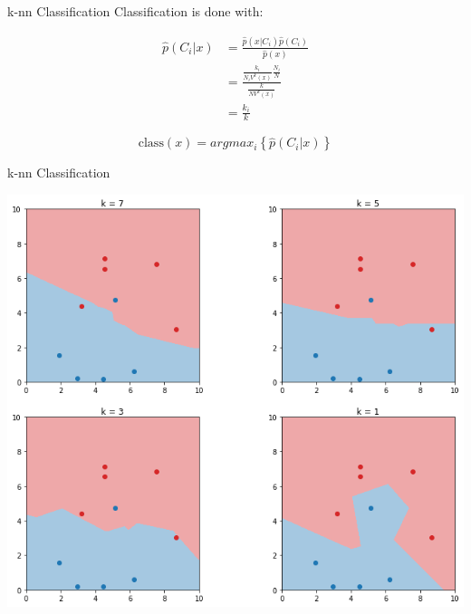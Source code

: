 \documentclass{beamer}
\begin{document}
\begin{frame}[fragile]{k-nn Classification}
	Classification is done with:
  
  \begin{align}
    \hat p(C_i | x) &= \frac{\hat p(x|C_i) \hat p(C_i)}{\hat p(x)}\\
                    &= \frac{\frac{k_{i}}{N_{i}V^{k}(x)}\frac{N_i}{N}}{\frac{k}{NV^{k}(x)}} \\
                    &= \frac{k_i}{k}
  \end{align}
  
  \begin{equation}
    \text{class}(x) = argmax_i \left \{\hat p(C_i | x) \right \}
  \end{equation}
\end{frame}

\begin{frame}[fragile]{k-nn Classification}
\begin{center}
  \includegraphics[height=0.9\textheight]{images/classification_knn.png}
\end{center}
\end{frame}
\end{document}
